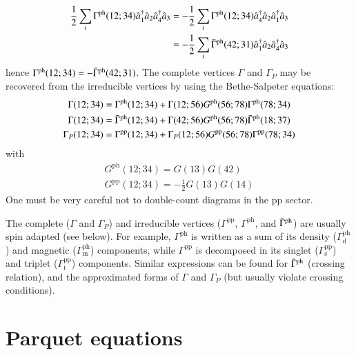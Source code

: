\documentclass[aip,jcp,reprint,noshowkeys,superscriptaddress]{revtex4-1}
\newcommand{\cre}[1]{\Hat{a}_{#1}^{\dag}}
\newcommand{\ani}[1]{\Hat{a}_{#1}}
\newcommand{\ph}{\text{ph}}
\newcommand{\pp}{\text{pp}}
\begin{document}
\begin{equation}
\begin{split}
	\frac{1}{2} \sum_i \Gamma^\ph(12;34) \cre{1} \ani{2} \cre{4} \ani{3} 
	& = - \frac{1}{2} \sum_i \Gamma^\ph(12;34) \cre{4} \ani{2} \cre{1} \ani{3} 
	\\
	& = - \frac{1}{2} \sum_i \Bar{\Gamma}^\ph(42;31) \cre{1} \ani{2} \cre{4} \ani{3} 
\end{split}
\end{equation}
hence $\Gamma^\ph(12;34) = -\Bar{\Gamma}^\ph(42;31)$.
The complete vertices $\Gamma$ and $\Gamma_P$ may be recovered from the irreducible vertices by using the Bethe-Salpeter equations:
\begin{gather}
	\Gamma(12;34) = \Gamma^\ph(12;34) + \Gamma(12;56) G^\ph(56;78) \Gamma^\ph(78;34)
	\\
	\Gamma(12;34) = \Bar{\Gamma}^\ph(12;34) + \Gamma(42;56) G^\ph(56;78) \Bar{\Gamma}^\ph(18;37)
	\\
	\Gamma_P(12;34) = \Gamma^\pp(12;34) + \Gamma_P(12;56) G^\pp(56;78) \Gamma^\pp(78;34)	
\end{gather}
with 
\begin{gather}
	G^\ph(12;34) = G(13) G(42)
	\\
	G^\pp(12;34) = -\frac{1}{2} G(13) G(14)
\end{gather}
One must be very careful not to double-count diagrams in the pp sector.

The complete ($\Gamma$ and $\Gamma_P$) and irreducible vertices ($\Gamma^\pp$, $\Gamma^\ph$, and $\Bar{\Gamma}^\ph$) are usually spin adapted (see below).
For example, $\Gamma^\ph$ is written as a sum of its density ($\Gamma^\ph_\text{d}$) and magnetic ($\Gamma^\ph_\text{m}$) components, while $\Gamma^\pp$ is decomposed in its singlet ($\Gamma^\pp_\text{s}$) and triplet ($\Gamma^\pp_\text{t}$) components.
Similar expressions can be found for $\Bar{\Gamma}^\ph$ (crossing relation), and the approximated forms of $\Gamma$ and $\Gamma_P$ (but usually violate crossing conditions).


\section{Parquet equations}
\end{document}
